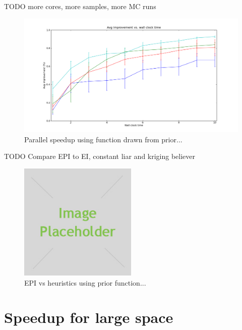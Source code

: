 \documentclass[phd,tocprelim]{cornell}
\begin{document}
TODO
more cores, more samples, more MC runs
\begin{figure}[hpt]
 	\centerline{\includegraphics[width=\textwidth]{figures/EPI/speedup_vs_wallclock_8_core_9_its.png}}
    \caption[Parallel speedup for function drawn from prior]{Parallel speedup using function drawn from prior...}
 	\label{fig:EPI_res1}
\end{figure}

TODO
Compare EPI to EI, constant liar and kriging believer
\begin{figure}[hpt]
 	\centerline{\includegraphics[width=0.5\textwidth]{figures/placeholder.jpg}}
    \caption[EPI vs heuristics using prior function]{EPI vs heuristics using prior function...}
 	\label{fig:EPI_res2}
\end{figure}

\section{Speedup for large space}
\end{document}
